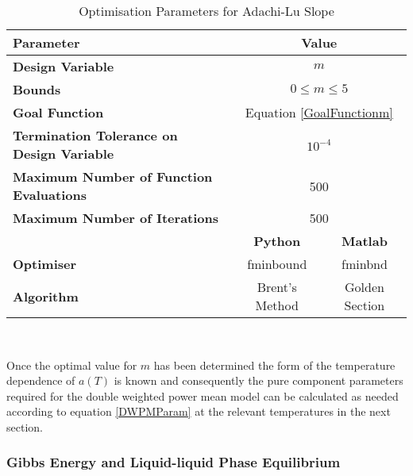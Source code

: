 			\begin{table}
			\begin{tabular*}{\textwidth}{l|cc}
				\hline
				\textbf{Parameter}&\multicolumn{2}{c}{\textbf{Value}}\\
				\hline
				\hline
				\textbf{Design Variable}& \multicolumn{2}{c}{$m$}\\
				\textbf{Bounds}& \multicolumn{2}{c}{$ 0 \leq m \leq 5$}\\
				\textbf{Goal Function}& \multicolumn{2}{c}{Equation \ref{GoalFunctionm}} \\
				\textbf{Termination Tolerance on Design Variable}& \multicolumn{2}{c}{$10^{-4}$ }\\
				\textbf{Maximum Number of Function Evaluations}& \multicolumn{2}{c}{500}\\
				\textbf{Maximum Number of Iterations}& \multicolumn{2}{c}{500}\\				
				\cline{2-3}
				&\textbf{Python}&\textbf{Matlab}\\
				\cline{2-3}
				\textbf{Optimiser }&fminbound&fminbnd\\
				\textbf{Algorithm}& Brent's Method&Golden Section\\
				\hline
				\end{tabular*}\\
			\caption{Optimisation Parameters for Adachi-Lu Slope} \label{mOptParam}			
			\end{table}
					
			Once the optimal value for $m$ has been determined the form of the temperature dependence of $a(T)$ is known and consequently the pure component parameters required for the double weighted power mean model can be calculated as needed according to equation \ref{DWPMParam} at the relevant temperatures in the next section.


			
			\subsubsection{Gibbs Energy and Liquid-liquid Phase Equilibrium}
								

